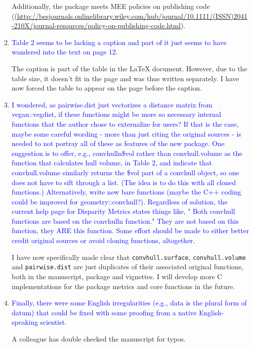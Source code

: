 \documentclass[12pt,letterpaper]{article}
\begin{document}
\begin{enumerate}
Additionally, the package meets MEE policies on publishing code (\url{(http://besjournals.onlinelibrary.wiley.com/hub/journal/10.1111/(ISSN)2041-210X/journal-resources/policy-on-publishing-code.html}).


\item{\textcolor{blue}{Table 2 seems to be lacking a caption and part of it just seems to have wandered into the text on page 12. }}

The caption is part of the table in the LaTeX document.
However, due to the table size, it doesn't fit in the page and was thus written separately.
I have now forced the table to appear on the page before the caption.

\item{\textcolor{blue}{I wondered, as pairwise.dist just vectorizes a distance matrix from vegan::vegdist, if these functions might be more so necessary internal functions that the author chose to externalize for users? 
If that is the case, maybe some careful wording - more than just citing the original sources - is needed to not portray all of these as features of the new package.
One suggestion is to offer, e.g., convhulln\$vol rather than convhull.volume as the function that calculates hull volume, in Table 2, and indicate that convhull.volume similarly returns the \$vol part of a convhull object, so one does not have to sift through a list. 
(The idea is to do this with all cloned functions.) 
Alternatively, write new bare functions (maybe the C++ coding could be improved for geometry::convhull?).
Regardless of solution, the current help page for Disparity Metrics states things like, " Both convhull functions are based on the convhulln function."  They are not based on this function, they ARE this function.  Some effort should be made to either better credit original sources or avoid cloning functions, altogether.}}

I have now specifically made clear that \texttt{convhull.surface}, \texttt{convhull.volume} and \texttt{pairwise.dist} are just duplicates of their associated original functions, both in the manuscript, package and vignettes.
I will develop more C implementations for the package metrics and core functions in the future.

\item{\textcolor{blue}{Finally, there were some English irregularities (e.g., data is the plural form of datum) that could be fixed with some proofing from a native English-speaking scientist.}}

A colleague has double checked the manuscript for typos.

\end{enumerate}
\end{document}
